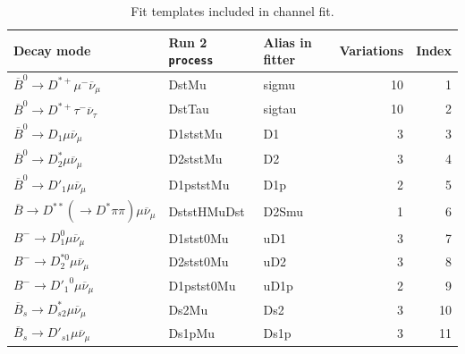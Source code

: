 \begin{table}[htb]
    \caption{Fit templates included in \Dstar channel fit.}
    \label{tab:fit-templates-dst}
    \footnotesize
    \centering
\begin{tabular}{lllrr}
\toprule
 {\bf Decay mode}  & {\bf Run 2 \texttt{process}} & {\bf Alias in fitter}  & {\bf Variations}  & {\bf Index} \\
\midrule
 $\overline{B}^0 \rightarrow D^{*+} \mu^- \overline{\nu}_\mu$                      & DstMu                    & sigmu             &           10 &       1 \\
 $\overline{B}^0 \rightarrow D^{*+} \tau^- \overline{\nu}_\tau$                    & DstTau                   & sigtau            &           10 &       2 \\
 $\overline{B}^0 \rightarrow D_1 \mu \overline{\nu}_\mu$                           & D1ststMu                 & D1                &            3 &       3 \\
 $\overline{B}^0 \rightarrow D^*_2 \mu \overline{\nu}_\mu$                         & D2ststMu                 & D2                &            3 &       4 \\
 $\overline{B}^0 \rightarrow D'_1 \mu \overline{\nu}_\mu$                          & D1pststMu                & D1p               &            2 &       5 \\
 $\overline{B} \rightarrow D^{**} (\rightarrow D^* \pi\pi) \mu \overline{\nu}_\mu$ & DststHMuDst              & D2Smu             &            1 &       6 \\
 $B^- \rightarrow D_1^0 \mu \overline{\nu}_\mu$                                    & D1stst0Mu                & uD1               &            3 &       7 \\
 $B^- \rightarrow D_2^{*0} \mu \overline{\nu}_\mu$                                 & D2stst0Mu                & uD2               &            3 &       8 \\
 $B^- \rightarrow {D'_1}^0 \mu \overline{\nu}_\mu$                                 & D1pstst0Mu               & uD1p              &            2 &       9 \\
 $\overline{B}_s \rightarrow D_{s2}^* \mu \overline{\nu}_\mu$                      & Ds2Mu                    & Ds2               &            3 &      10 \\
 $\overline{B}_s \rightarrow D'_{s1} \mu \overline{\nu}_\mu$                       & Ds1pMu                   & Ds1p              &            3 &      11 \\

\end{tabular}
\end{table}
